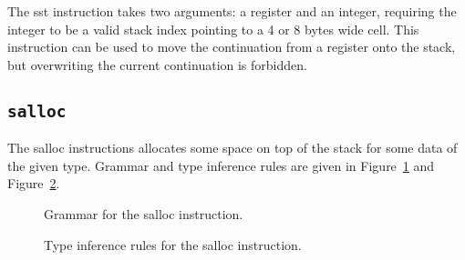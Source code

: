 The {\Iformat sst} instruction takes two arguments: a register and an integer, requiring the integer to be a valid stack index pointing to a 4 or 8 bytes wide cell.
This instruction can be used to move the continuation from a register onto the stack, but overwriting the current continuation is forbidden.

\subsection{\texttt{salloc}}\label{subsec:nstar-instructionset-stack-salloc}

The {\Iformat salloc} instructions allocates some space on top of the stack for some data of the given type.
Grammar and type inference rules are given in Figure~\ref{fig:nstar-instructionset-stack-salloc-grammar} and Figure~\ref{fig:nstar-instructionset-stack-salloc-typerules}.

\begin{figure}[H]
	\centering


	\caption{Grammar for the {\Iformat salloc} instruction.}
	\label{fig:nstar-instructionset-stack-salloc-grammar}
\end{figure}

\begin{figure}[H]
	\centering


	\caption{Type inference rules for the {\Iformat salloc} instruction.}
	\label{fig:nstar-instructionset-stack-salloc-typerules}
\end{figure}


